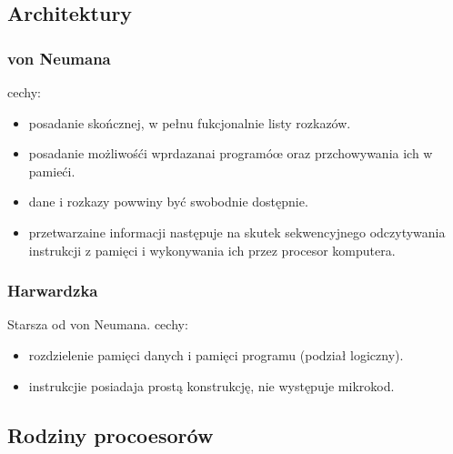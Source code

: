 \documentclass[11pt]{article}
\begin{document}
\subsection{Architektury}
\label{sec:org1fc361a}
\subsubsection{von Neumana}
\label{sec:org2a0eb6c}
cechy:
\begin{itemize}
\item posadanie skończnej, w pełnu fukcjonalnie listy rozkazów.
\item posadanie możliwośći wprdazanai programóœ oraz przchowywania ich w pamieći.
\item dane i rozkazy powwiny być swobodnie dostępnie.
\item przetwarzaine informacji następuje na skutek sekwencyjnego odczytywania instrukcji z pamięci i wykonywania ich przez procesor komputera.
\end{itemize}
\subsubsection{Harwardzka}
\label{sec:org6c3af21}
Starsza od von Neumana.
cechy:
\begin{itemize}
\item rozdzielenie pamięci danych i pamięci programu (podział logiczny).
\item instrukcjie posiadaja prostą konstrukcję, nie występuje mikrokod.
\end{itemize}
\subsection{Rodziny procoesorów}
\label{sec:org6419fa4}
\end{document}
